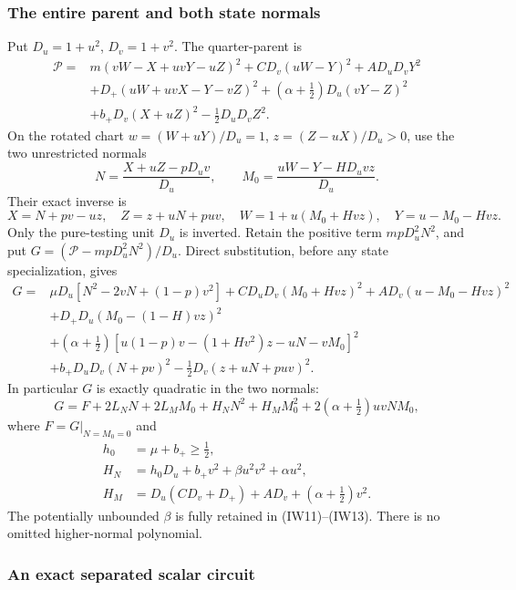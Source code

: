 \subsubsection*{The entire parent and both state normals}

Put $D_u=1+u^2$, $D_v=1+v^2$. The quarter-parent is
\[
\begin{split}
 \mathcal P={}&m(vW-X+uvY-uZ)^2+CD_v(uW-Y)^2+AD_uD_vY^2\\
 &+D_+(uW+uvX-Y-vZ)^2
 +(\alpha+\tfrac12)D_u(vY-Z)^2\\
 &+b_+D_v(X+uZ)^2-\tfrac12D_uD_vZ^2.
\end{split}                                                     \tag{IW9}
\]
On the rotated chart
$w=(W+uY)/D_u=1$, $z=(Z-uX)/D_u>0$, use the two unrestricted normals
\[
 N=\frac{X+uZ-pD_uv}{D_u},\qquad
 M_0=\frac{uW-Y-HD_uvz}{D_u}.
\]
Their exact inverse is
\[
 X=N+pv-uz,\quad Z=z+uN+puv,\quad
 W=1+u(M_0+Hvz),\quad Y=u-M_0-Hvz.                     \tag{IW10}
\]
Only the pure-testing unit $D_u$ is inverted. Retain the positive
term $mpD_u^2N^2$, and put $G=(\mathcal P-mpD_u^2N^2)/D_u$.
Direct substitution, before any state specialization, gives
\[
\begin{split}
 G={}&\mu D_u[N^2-2vN+(1-p)v^2]
      +CD_uD_v(M_0+Hvz)^2+A D_v(u-M_0-Hvz)^2\\
 &+D_+D_u(M_0-(1-H)vz)^2\\
 &+(\alpha+\tfrac12)
       [u(1-p)v-(1+Hv^2)z-uN-vM_0]^2\\
 &+b_+D_uD_v(N+pv)^2-\tfrac12D_v(z+uN+puv)^2.
\end{split}                                                     \tag{IW11}
\]
In particular $G$ is exactly quadratic in the two normals:
\[
 G=F+2L_NN+2L_MM_0+H_NN^2+H_MM_0^2
                         +2(\alpha+\tfrac12)uvNM_0,
                                                               \tag{IW12}
\]
where $F=G|_{N=M_0=0}$ and
\[
\begin{split}
 h_0&=\mu+b_+\geq\tfrac12,\\
 H_N&=h_0D_u+b_+v^2+\beta u^2v^2+\alpha u^2,\\
 H_M&=D_u(CD_v+D_+)+AD_v+(\alpha+\tfrac12)v^2.
\end{split}                                                     \tag{IW13}
\]
The potentially unbounded $\beta$ is fully retained in (IW11)--(IW13).
There is no omitted higher-normal polynomial.

\subsubsection*{An exact separated scalar circuit}

